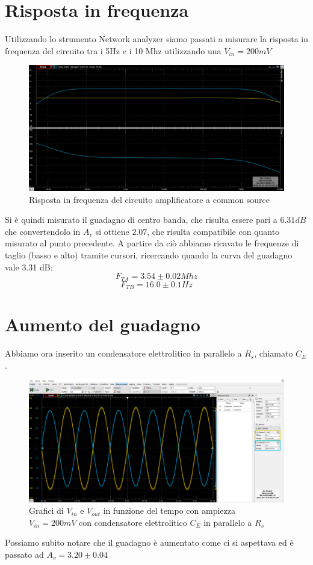 \documentclass[10pt, a4paper, italian]{article}
\begin{document}
\section{Risposta in frequenza}
Utilizzando lo strumento Network analyzer siamo passati a misurare la risposta in frequenza del circuito tra i 5Hz e i 10 Mhz utilizzando una $V_{in}=200 mV$\\
\begin{figure}[H]
    \centering
	\includegraphics[scale=0.4]{network}
    \caption{Risposta in frequenza del circuito amplificatore a common source}
\end{figure}
Si è quindi misurato il guadagno di centro banda, che risulta essere pari a $6.31 dB$ che convertendolo in $A_v$ si ottiene $2.07$, che risulta compatibile con quanto misurato al punto precedente.
A partire da ciò abbiamo ricavato le frequenze di taglio (basso e alto) tramite cursori, ricercando quando la curva del guadagno vale 3.31 dB:
\[
F_{TA}=3.54 \pm 0.02Mhz
\]
\[
F_{TB}= 16.0 \pm 0.1Hz
\]
\section{Aumento del guadagno}
Abbiamo ora inserito un condensatore elettrolitico in parallelo a $R_s$, chiamato $C_E$.
\begin{figure}[H]
    \centering
	\includegraphics[scale=0.4]{amp.200.cap}
    \caption{Grafici di $V_{in}$ e $V_{out}$ in funzione del tempo con ampiezza $V_{in}=200 mV$ con condensatore elettrolitico $C_E$ in parallelo a $R_s$}
\end{figure}
Possiamo subito notare che il guadagno è aumentato come ci si aspettava ed è passato ad $A_v =3.20 \pm 0.04$
\end{document}

